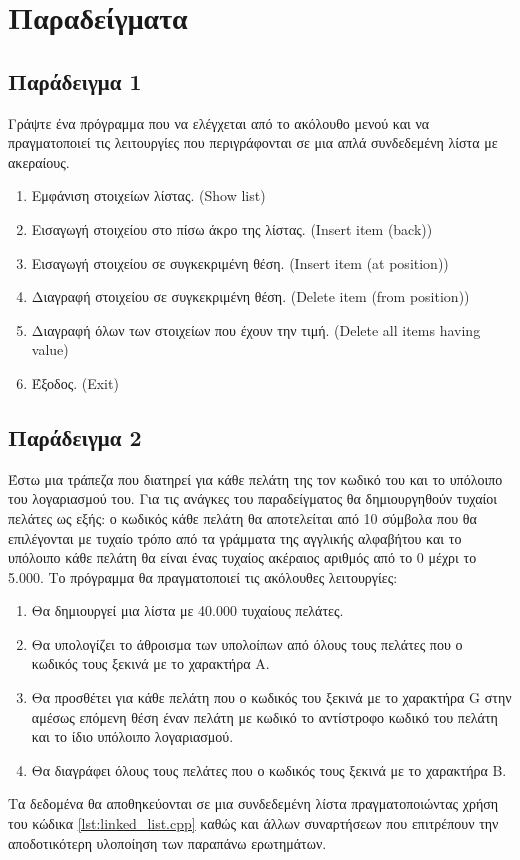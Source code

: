 



\section{Παραδείγματα}
\subsection{Παράδειγμα 1}
Γράψτε ένα πρόγραμμα που να ελέγχεται από το ακόλουθο μενού και να πραγματοποιεί τις λειτουργίες που περιγράφονται σε μια απλά συνδεδεμένη λίστα με ακεραίους.
\begin{enumerate}[nolistsep]
\item Εμφάνιση στοιχείων λίστας. (Show list)
\item Εισαγωγή στοιχείου στο πίσω άκρο της λίστας. (Insert item (back))
\item Εισαγωγή στοιχείου σε συγκεκριμένη θέση. (Insert item (at position)) 
\item Διαγραφή στοιχείου σε συγκεκριμένη θέση. (Delete item (from position))
\item Διαγραφή όλων των στοιχείων που έχουν την τιμή. (Delete all items having value)
\item Έξοδος. (Exit)
\end{enumerate}






\subsection{Παράδειγμα 2}
Έστω μια τράπεζα που διατηρεί για κάθε πελάτη της τον κωδικό του και το υπόλοιπο του λογαριασμού του. Για τις ανάγκες του παραδείγματος θα δημιουργηθούν τυχαίοι πελάτες ως εξής: ο κωδικός κάθε πελάτη θα αποτελείται από 10 σύμβολα που θα επιλέγονται με τυχαίο τρόπο από τα γράμματα της αγγλικής αλφαβήτου και το υπόλοιπο κάθε πελάτη θα είναι ένας τυχαίος ακέραιος αριθμός από το 0 μέχρι το 5.000. Το πρόγραμμα θα πραγματοποιεί τις ακόλουθες λειτουργίες: 
\begin{enumerate}[noitemsep,label=\Alph*]
\item Θα δημιουργεί μια λίστα με 40.000 τυχαίους πελάτες.
\item Θα υπολογίζει το άθροισμα των υπολοίπων από όλους τους πελάτες που ο κωδικός τους ξεκινά με το χαρακτήρα Α.
\item Θα προσθέτει για κάθε πελάτη που ο κωδικός του ξεκινά με το χαρακτήρα G στην αμέσως επόμενη θέση έναν πελάτη με κωδικό το αντίστροφο κωδικό του πελάτη και το ίδιο υπόλοιπο λογαριασμού.
\item Θα διαγράφει όλους τους πελάτες που ο κωδικός τους ξεκινά με το χαρακτήρα Β.
\end{enumerate}
Τα δεδομένα θα αποθηκεύονται σε μια συνδεδεμένη λίστα πραγματοποιώντας χρήση του κώδικα \ref{lst:linked_list.cpp} καθώς και άλλων συναρτήσεων που επιτρέπουν την αποδοτικότερη υλοποίηση των παραπάνω ερωτημάτων.

